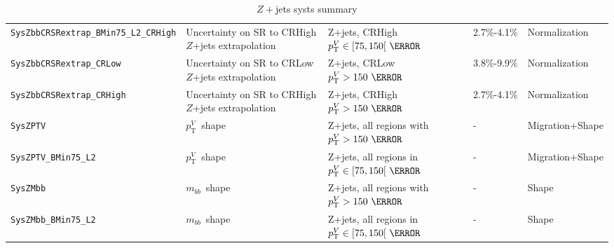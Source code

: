 \begin{table}
{\begin{tabular}{lllll}
      \texttt{SysZbbCRSRextrap\_BMin75\_L2\_CRHigh} & Uncertainty on SR to CRHigh $Z$+jets extrapolation & Z+jets, CRHigh $p_{\mathrm{T}}^V\in[75,150[~\GeV$ & 2.7\%-4.1\% & Normalization\\      
      \texttt{SysZbbCRSRextrap\_CRLow} & Uncertainty on SR to CRLow $Z$+jets extrapolation & Z+jets, CRLow $p_{\mathrm{T}}^V>150~\GeV$ & 3.8\%-9.9\% & Normalization\\
      \texttt{SysZbbCRSRextrap\_CRHigh} & Uncertainty on SR to CRHigh $Z$+jets extrapolation & Z+jets, CRHigh $p_{\mathrm{T}}^V>150~\GeV$ & 2.7\%-4.1\% & Normalization\\         
      \texttt{SysZPTV} & $p_{\mathrm{T}}^V$\ shape & Z+jets, all regions with $p_{\mathrm{T}}^V>150~\GeV$ & - & Migration+Shape \\
      \texttt{SysZPTV\_BMin75\_L2} & $p_{\mathrm{T}}^V$\ shape & Z+jets, all regions in $p_{\mathrm{T}}^V\in[75,150[~\GeV$ & - & Migration+Shape \\
      \texttt{SysZMbb} & $m_{bb}$\ shape & Z+jets, all regions with $p_{\mathrm{T}}^V>150~\GeV$ & - & Shape \\
      \texttt{SysZMbb\_BMin75\_L2} & $m_{bb}$\ shape & Z+jets, all regions in $p_{\mathrm{T}}^V\in[75,150[~\GeV$ & - & Shape \\
      \bottomrule
    \end{tabular}
  }
  \caption{$Z+$jets systs summary}
  \label{tab:Zjets_systematics}
\end{table}